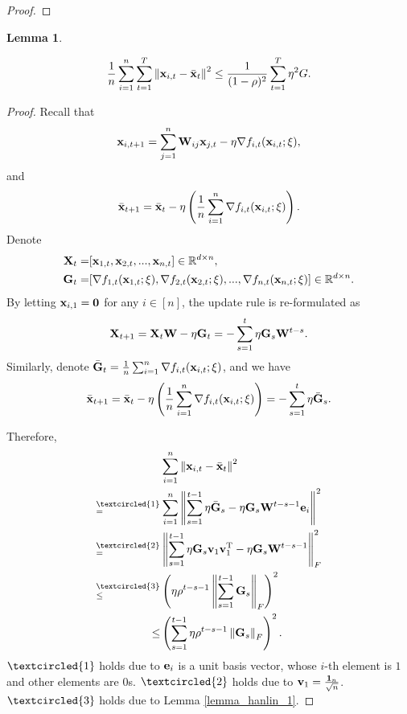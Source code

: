 \documentclass{article}
\newtheorem{Lemma}{\bf{Lemma}}
\begin{document}
\begin{proof}
\end{proof}


\begin{Lemma}
\label{lemma_x_variance_norm_square}

\begin{align}
\nonumber
\frac{1}{n}\sum_{i=1}^n \sum_{t=1}^T \left\lVert{\bf x}_{i,t} - \bar{{\bf x}}_t\right\rVert^2 \le \frac{1}{(1-\rho)^2} \sum_{t=1}^T \eta^2 G.
\end{align}

\end{Lemma}
\begin{proof}


Recall that 
\begin{align}
\nonumber
{\bf x}_{i,t+1} = \sum_{j=1}^n {\bf W}_{ij}{\bf x}_{j,t} - \eta \nabla f_{i,t}({\bf x}_{i,t};\xi),
\end{align} and 
\begin{align}
\nonumber
\bar{{\bf x}}_{t+1} = \bar{{\bf x}}_t - \eta \left( \frac{1}{n}\sum_{i=1}^n \nabla f_{i,t}({\bf x}_{i,t};\xi) \right).
\end{align} Denote 
\begin{align}
\nonumber
{\bf X}_t = &  [{\bf x}_{1,t}, {\bf x}_{2,t}, ..., {\bf x}_{n,t}] \in \mathbb{R}^{d\times n}, \\ \nonumber
{\bf G}_t = & [\nabla f_{1,t}({\bf x}_{1,t};\xi), \nabla f_{2,t}({\bf x}_{2,t};\xi), ..., \nabla f_{n,t}({\bf x}_{n,t};\xi)] \in \mathbb{R}^{d\times n}.
\end{align} By letting ${\bf x}_{i,1} = {\bf 0}$ for any $i\in[n]$, the update rule is re-formulated as 
\begin{align}
\nonumber
{\bf X}_{t+1} = {\bf X}_t {\bf W} - \eta {\bf G}_t = - \sum_{s=1}^t \eta {\bf G}_s {\bf W}^{t-s}. 
\end{align} Similarly, denote $\bar{{\bf G}}_t = \frac{1}{n}\sum_{i=1}^n \nabla f_{i,t}({\bf x}_{i,t};\xi)$, and we have
\begin{align}
\bar{{\bf x}}_{t+1} = \bar{{\bf x}}_t - \eta \left( \frac{1}{n}\sum_{i=1}^n \nabla f_{i,t}({\bf x}_{i,t};\xi) \right) = - \sum_{s=1}^t \eta \bar{{\bf G}}_s. 
\end{align}


Therefore, 
\begin{align}
\nonumber
& \sum_{i=1}^n \lrnorm{\x_{i,t} - \bar{\x}_t}^2 \\ \nonumber
\refabovecir{=}{\textcircled{1}} & \sum_{i=1}^n \lrnorm{ \sum_{s=1}^{t-1} \eta \bar{\G}_s - \eta \G_s \W^{t-s-1}\e_i }^2   \\ \nonumber
\refabovecir{=}{\textcircled{2}} & \lrnorm{ \sum_{s=1}^{t-1} \eta \G_s\v_1 \v_1\Tr - \eta \G_s \W^{t-s-1} }^2_F   \\ \nonumber
\refabovecir{\le}{\textcircled{3}} & \lrincir{ \eta \rho^{t-s-1} \lrnorm{\sum_{s=1}^{t-1}\G_s}_F}^2 \\ \nonumber
\le & \lrincir{ \sum_{s=1}^{t-1} \eta \rho^{t-s-1} \lrnorm{\G_s}_F}^2.
\end{align} $\textcircled{1}$ holds due to ${\bf e}_i$ is a unit basis vector, whose $i$-th element is $1$ and other elements are $0$s. $\textcircled{2}$ holds due to ${\bf v}_1 = \frac{{\bf 1}_n}{\sqrt{n}}$. $\textcircled{3}$ holds due to Lemma \ref{lemma_hanlin_1}. 


\end{proof}
\end{document}
